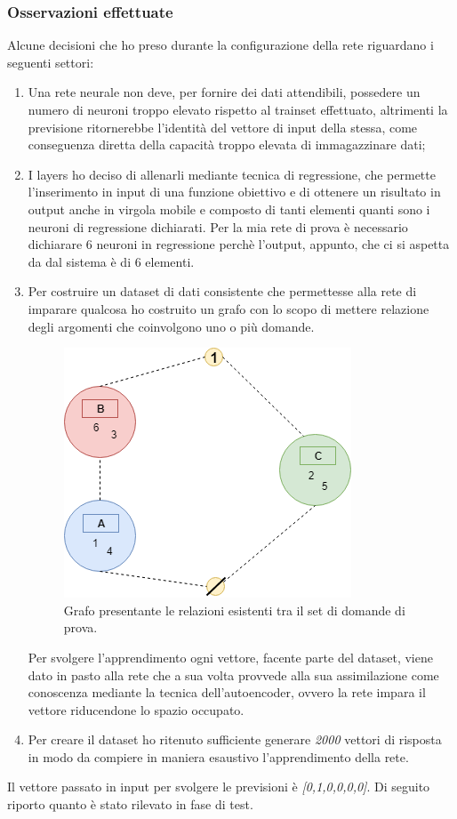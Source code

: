 \documentclass[10pt,a4paper]{article}
\begin{document}
\subsubsection{Osservazioni effettuate}
\label{Osservazioni effettuate}

Alcune decisioni che ho preso durante la configurazione della rete riguardano i seguenti settori:
\begin{enumerate}
\item Una rete neurale non deve, per fornire dei dati attendibili, possedere un numero di neuroni troppo elevato rispetto al trainset effettuato, altrimenti la previsione  ritornerebbe l'identit\`a del vettore di input della stessa, come conseguenza diretta della capacit\`a troppo elevata di immagazzinare dati;
\item I layers ho deciso di allenarli mediante tecnica di regressione, che permette l'inserimento in input di una funzione obiettivo e di ottenere un risultato in output anche in virgola mobile e composto di tanti elementi quanti sono i neuroni di regressione dichiarati. Per la mia rete di prova \`e necessario dichiarare  6 neuroni in regressione perch\`e l'output, appunto, che ci si aspetta da dal sistema \`e di 6 elementi.
\item Per costruire un dataset di dati consistente che permettesse alla rete di imparare qualcosa ho costruito un grafo con lo scopo di mettere relazione degli argomenti che coinvolgono uno o pi\`u domande.
\begin{figure}[H]
\centering
	\includegraphics[width=0.60\linewidth]{image/grafo_trainset.png}
	\caption{Grafo presentante le relazioni esistenti tra il set di domande di prova.}
\end{figure}
\noindent
Per svolgere l'apprendimento ogni vettore, facente parte del dataset, viene dato in pasto alla rete che a sua volta provvede alla sua assimilazione come conoscenza mediante la tecnica dell'autoencoder, ovvero la rete impara il vettore riducendone lo spazio occupato.
\item Per creare il dataset ho ritenuto sufficiente generare \textit{2000} vettori di risposta in modo da compiere in maniera esaustivo l'apprendimento della rete.
\end{enumerate}
\noindent
Il vettore passato in input per svolgere le previsioni \`e \textit{[0,1,0,0,0,0]}. 
Di seguito riporto quanto \`e stato rilevato in  fase di test.
\end{document}
